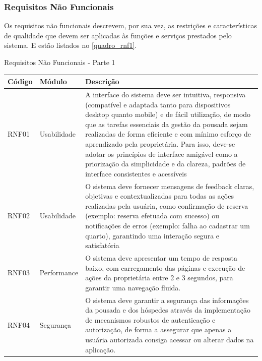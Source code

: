\documentclass[
	12pt,				%
	openany,			%
	oneside,			%
	a4paper,			%
	english,			%
	french,				%
	spanish,			%
	brazil				%
	]{abntex2}
\begin{document}
\subsubsection{Requisitos Não Funcionais}
Os requisitos não funcionais descrevem, por sua vez, as restrições e características de qualidade que devem ser aplicadas às funções e serviços prestados pelo sistema. E  estão listados no \autoref{quadro_rnf1}.
\begin{quadro}[H]
	\caption{\label{quadro_rnf1}Requisitos Não Funcionais - Parte 1}
	\begin{tabular}{|>{\centering\arraybackslash}m{2cm}|>{\centering\arraybackslash}m{4cm}|>{\raggedright\arraybackslash}m{8cm}|}
		\hline
		\textbf{Código} & \textbf{Módulo} & \textbf{Descrição} 
		\\ \hline
		RNF01 & Usabilidade & A interface do sistema deve ser intuitiva, responsiva (compatível e adaptada tanto para dispositivos desktop quanto mobile)  e de fácil utilização, de modo que as tarefas essenciais da gestão da pousada sejam realizadas de forma eficiente e com mínimo esforço de aprendizado pela proprietária.  Para isso, deve-se adotar os princípios de interface amigável como a priorização da simplicidade e da clareza, padrões de interface consistentes e acessíveis
		\\ \hline
		RNF02 & Usabilidade & O sistema deve fornecer mensagens de feedback claras, objetivas e contextualizadas para  todas as ações  realizadas pela usuária, como confirmação de reserva (exemplo: reserva efetuada com sucesso) ou notificações de erros (exemplo: falha ao cadastrar um quarto), garantindo uma interação segura e  satisfatória 
		\\ \hline
		RNF03 & Performance & O sistema deve apresentar um tempo de resposta baixo, com carregamento das páginas e execução de ações da proprietária entre 2 e 3 segundos, para garantir uma navegação fluida.
		 \\ \hline
		RNF04 & Segurança & O sistema deve garantir a segurança das informações da pousada e dos hóspedes através da implementação de mecanismos robustos de autenticação e autorização, de forma a assegurar que apenas a usuária autorizada consiga acessar ou alterar dados na aplicação.
		\\ \hline
	\end{tabular}
\end{quadro}
%
\end{document}
